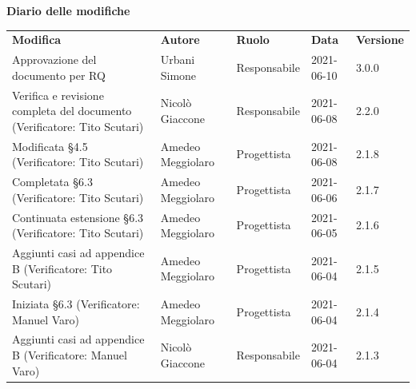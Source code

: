 \documentclass[a4paper]{article}
\begin{document}
\begin{center}
    \textbf{\Large Diario delle modifiche}\\
    \vspace{10px}
    \begin{table}[h!]
        \centering
        \renewcommand{\arraystretch}{1.8}
        \begin{tabular}{p{160px} p{90px} p{70px} p{55px} p{45px}}
            \rowcolor{logo!70} \textbf{Modifica}                          & \textbf{Autore}   & \textbf{Ruolo} & \textbf{Data} & \textbf{Versione} \\
            Approvazione del documento per RQ                                                                       & Urbani Simone     & Responsabile   & 2021-06-10    & 3.0.0             \\
            Verifica e revisione completa del documento \newline(Verificatore: Tito Scutari)                        & Nicolò Giaccone   & Responsabile   & 2021-06-08    & 2.2.0             \\
            Modificata \S 4.5 \newline(Verificatore: Tito Scutari)                                                  & Amedeo Meggiolaro & Progettista    & 2021-06-08    & 2.1.8             \\
            Completata \S 6.3 \newline(Verificatore: Tito Scutari)                                                  & Amedeo Meggiolaro & Progettista    & 2021-06-06    & 2.1.7             \\
            Continuata estensione \S 6.3 \newline(Verificatore: Tito Scutari)                                       & Amedeo Meggiolaro & Progettista    & 2021-06-05    & 2.1.6             \\
            Aggiunti casi ad appendice B \newline(Verificatore: Tito Scutari)                                       & Amedeo Meggiolaro & Progettista    & 2021-06-04    & 2.1.5             \\
            Iniziata \S 6.3 \newline(Verificatore: Manuel Varo)                                                     & Amedeo Meggiolaro & Progettista    & 2021-06-04    & 2.1.4             \\
            Aggiunti casi ad appendice B \newline(Verificatore: Manuel Varo)                                        & Nicolò Giaccone   & Responsabile   & 2021-06-04    & 2.1.3             \\

\end{tabular}
\end{table}
\end{center}
\end{document}
